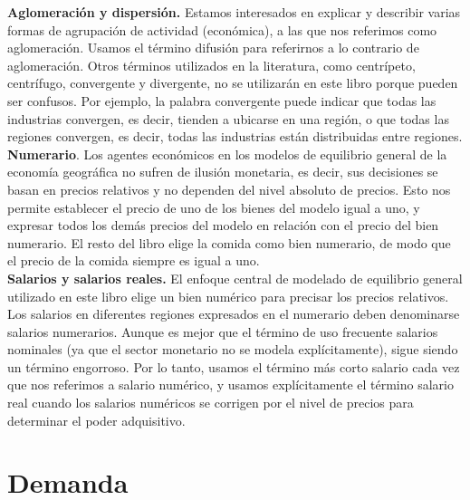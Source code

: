 \textbf{Aglomeración y dispersión.} Estamos interesados en explicar y describir varias formas de agrupación de actividad (económica), a las que nos referimos como aglomeración. Usamos el término difusión para referirnos a lo contrario de aglomeración. Otros términos utilizados en la literatura, como centrípeto, centrífugo, convergente y divergente, no se utilizarán en este libro porque pueden ser confusos. Por ejemplo, la palabra convergente puede indicar que todas las industrias convergen, es decir, tienden a ubicarse en una región, o que todas las regiones convergen, es decir, todas las industrias están distribuidas entre regiones.\\
\textbf{Numerario}. Los agentes económicos en los modelos de equilibrio general de la economía geográfica no sufren de ilusión monetaria, es decir, sus decisiones se basan en precios relativos y no dependen del nivel absoluto de precios. Esto nos permite establecer el precio de uno de los bienes del modelo igual a uno, y expresar todos los demás precios del modelo en relación con el precio del bien numerario. El resto del libro elige la comida como bien numerario, de modo que el precio de la comida siempre es igual a uno.\\
\textbf{Salarios y salarios reales.} El enfoque central de modelado de equilibrio general utilizado en este libro elige un bien numérico para precisar los precios relativos. Los salarios en diferentes regiones expresados en el numerario deben denominarse salarios numerarios. Aunque es mejor que el término de uso frecuente salarios nominales (ya que el sector monetario no se modela explícitamente), sigue siendo un término engorroso. Por lo tanto, usamos el término más corto salario cada vez que nos referimos a salario numérico, y usamos explícitamente el término salario real cuando los salarios numéricos se corrigen por el nivel de precios para determinar el poder adquisitivo.

\section{Demanda}



